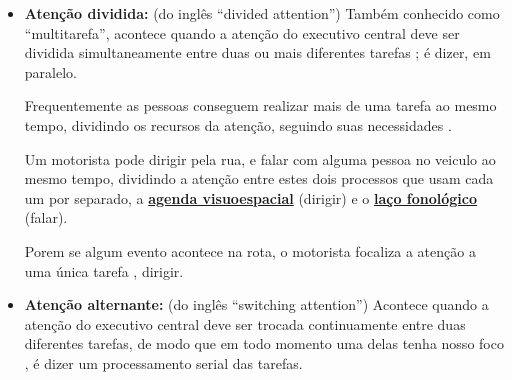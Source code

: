 \begin{itemize}
\item \textbf{Atenção dividida:} (do inglês ``divided attention'') 
Também conhecido como ``multitarefa'', acontece quando a atenção do executivo central deve ser dividida simultaneamente 
entre duas ou mais diferentes tarefas 
\cite[pp. 282]{braisby2012cognitive} \cite[pp. 155, 716]{eysenck2017manual} \cite[pp. 127]{eysenck2017manual};
é dizer, em paralelo.

Frequentemente as pessoas conseguem realizar mais de uma tarefa ao mesmo tempo,
dividindo os recursos da atenção, seguindo suas necessidades
\cite[pp. 124]{sternbergpsicologia}.

\begin{example}
\label{ex:motoristadividido}
Um motorista pode dirigir pela rua, e falar com alguma pessoa no veiculo ao mesmo tempo,
dividindo a atenção entre estes dois processos que usam cada um por separado,
a \hyperref[reflabel:visuoespacial]{\textbf{agenda  visuoespacial}} (dirigir)
e o \hyperref[reflabel:fonologico]{\textbf{laço fonológico}} (falar).

Porem se algum evento acontece na rota, o motorista focaliza a atenção a uma única tarefa ,
dirigir.
\end{example}

\item \textbf{Atenção alternante:} (do inglês ``switching attention'')
Acontece quando a atenção do executivo central deve ser trocada continuamente 
entre duas diferentes tarefas, de modo que em todo momento uma delas tenha nosso foco 
\cite[pp. 282]{braisby2012cognitive} \cite[pp. 127]{eysenck2017manual}, 
é dizer um processamento serial das tarefas.
\end{itemize}




